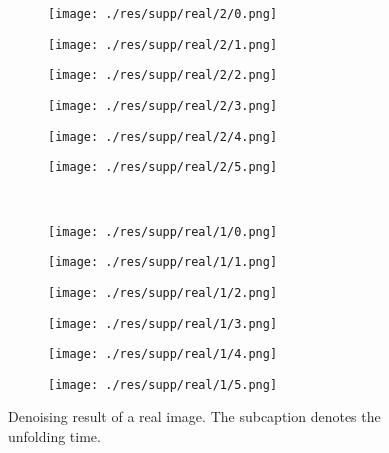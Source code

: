 \documentclass{article} %
\begin{document}
\begin{figure}[htp!]
	\centering
	\begin{subfigure}[t]{0.15\textwidth}
		\centering
		\texttt{[image: ./res/supp/real/2/0.png]}
	\end{subfigure}
	\begin{subfigure}[t]{0.15\textwidth}
		\centering
		\texttt{[image: ./res/supp/real/2/1.png]}
	\end{subfigure}
	\begin{subfigure}[t]{0.15\textwidth}
		\centering
		\texttt{[image: ./res/supp/real/2/2.png]}
	\end{subfigure}
	\begin{subfigure}[t]{0.15\textwidth}
		\centering
		\texttt{[image: ./res/supp/real/2/3.png]}
	\end{subfigure}
	\begin{subfigure}[t]{0.15\textwidth}
		\centering
		\texttt{[image: ./res/supp/real/2/4.png]}
	\end{subfigure}
	\begin{subfigure}[t]{0.15\textwidth}
		\centering
		\texttt{[image: ./res/supp/real/2/5.png]}
	\end{subfigure}\\
	\centering
	\begin{subfigure}[t]{0.15\textwidth}
		\centering
		\texttt{[image: ./res/supp/real/1/0.png]}
	\end{subfigure}
	\begin{subfigure}[t]{0.15\textwidth}
		\centering
		\texttt{[image: ./res/supp/real/1/1.png]}
	\end{subfigure}
	\begin{subfigure}[t]{0.15\textwidth}
		\centering
		\texttt{[image: ./res/supp/real/1/2.png]}
	\end{subfigure}
	\begin{subfigure}[t]{0.15\textwidth}
		\centering
		\texttt{[image: ./res/supp/real/1/3.png]}
	\end{subfigure}
	\begin{subfigure}[t]{0.15\textwidth}
		\centering
		\texttt{[image: ./res/supp/real/1/4.png]}
	\end{subfigure}
	\begin{subfigure}[t]{0.15\textwidth}
		\centering
		\texttt{[image: ./res/supp/real/1/5.png]}
	\end{subfigure}
	\caption{Denoising result of a real image. The subcaption denotes the unfolding time.}
	\label{real1}
\end{figure}
\end{document}
